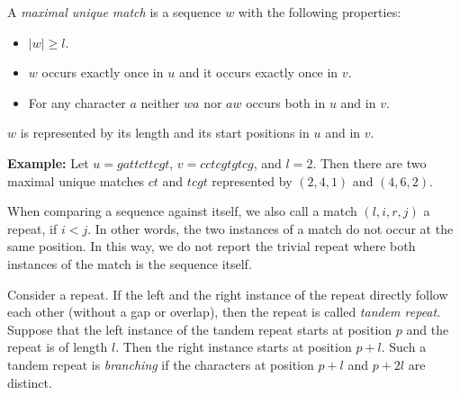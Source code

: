 \documentclass[12pt,titlepage]{article}
\newcommand{\Size}[1]{|#1|}
\begin{document}
\begin{AboutVmatch}
A \emph{maximal unique match} is a sequence \(w\)
with the following properties:
\begin{itemize}
\item
\(\Size{w}\geq l\).
\item
\(w\) occurs exactly once in \(u\) and it occurs exactly once in \(v\).
\item
For any character \(a\) neither \(wa\) nor \(aw\) occurs both in \(u\) and in
\(v\).
\end{itemize}
\(w\) is represented by its length and its start positions in \(u\) and
in \(v\).

\textbf{Example:}
Let \(u=gattcttcgt\), \(v=cctcgtgtcg\), and \(l=2\). Then there are two
maximal unique matches \(ct\) and \(tcgt\) represented by \((2,4,1)\) and
\((4,6,2)\).

When comparing a sequence against itself, we also call a match 
\((l,i,r,j)\) a repeat, if \(i<j\). In other words, the two instances
of a match do not occur at the same position. In this way, we do 
not report the trivial repeat where both instances of the match 
is the sequence itself.

Consider a repeat. If the left and the right instance of the repeat
directly follow each other (without a gap or overlap), then the 
repeat is called 
\emph{tandem repeat}. Suppose that the left instance of 
the tandem repeat starts at position \(p\) and the repeat is of length
\(l\). Then the right instance starts at position \(p+l\). Such a
tandem repeat is 
\emph{branching} if the characters at position \(p+l\) and 
\(p+2l\) are distinct.

\end{AboutVmatch}
\end{document}
